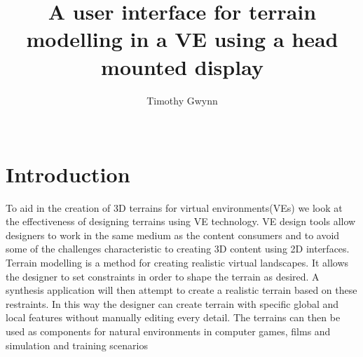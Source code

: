 \documentclass{sig-alternate-05-2015}
\begin{document}
\title{A user interface for terrain modelling in a VE using a head mounted display}

\author{
\alignauthor
Timothy Gwynn\\
       \\
}
\maketitle
\begin{CCSXML}

\end{CCSXML}



\printccsdesc

\section{Introduction}
To aid in the creation of 3D terrains for virtual environments(VEs) we look at the effectiveness of designing terrains using VE technology. VE design tools allow designers to work in the same medium as the content consumers and to avoid some of the challenges characteristic to creating 3D content using 2D interfaces.\\

Terrain modelling is a method for creating realistic virtual landscapes. It allows the designer to set constraints in order to shape the terrain as desired. A synthesis application will then attempt to create a realistic terrain based on these restraints. In this way the designer can create terrain with specific global and local features without manually editing every detail. The terrains can then be used as components for natural environments in computer games, films and simulation and training scenarios\cite{Gain2015}
\end{document}
